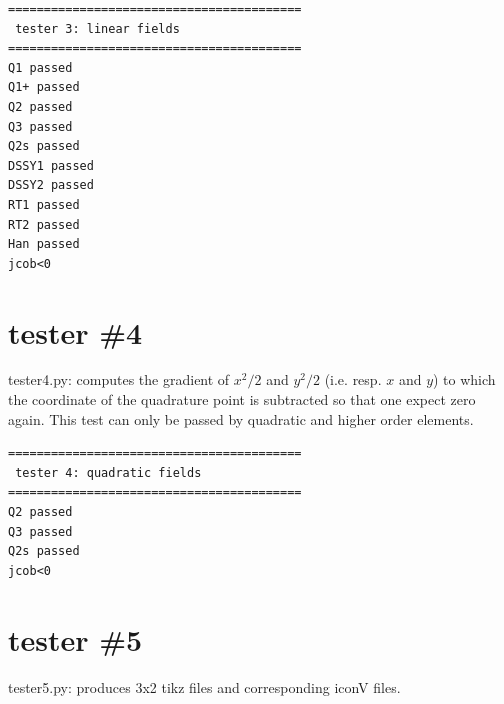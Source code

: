\begin{tiny}
\begin{verbatim}
=========================================
 tester 3: linear fields
=========================================
Q1 passed
Q1+ passed
Q2 passed
Q3 passed
Q2s passed
DSSY1 passed
DSSY2 passed
RT1 passed
RT2 passed
Han passed
jcob<0
\end{verbatim}
\end{tiny}



\newpage
\section*{tester \#4}


{\pythonfile tester4.py}: computes the gradient of $x^2/2$ and $y^2/2$ (i.e. resp. $x$ and $y$) to which the coordinate of the quadrature point is subtracted so that one expect zero again. This test can only be passed by quadratic and higher order elements.



\begin{tiny}
\begin{verbatim}
=========================================
 tester 4: quadratic fields
=========================================
Q2 passed
Q3 passed
Q2s passed
jcob<0
\end{verbatim}
\end{tiny}



\newpage
\section*{tester \#5}

{\pythonfile tester5.py}: produces 3x2 tikz files and corresponding iconV files. 

